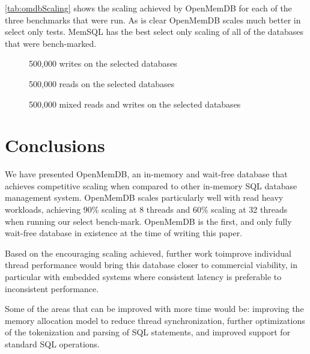 \documentclass[conference, compsoc]{IEEEtran}
\begin{document}
\ref{tab:omdbScaling} shows the scaling achieved by OpenMemDB for each of the three
benchmarks that were run. As is clear OpenMemDB scales much better in select only tests. 
MemSQL has the best select only scaling of all of the databases that were bench-marked.  

\begin{figure}
  \caption{500,000 writes on the selected databases}
\end{figure}

\begin{figure}
  \caption{500,000 reads on the selected databases}
\end{figure}

\begin{figure}
  \caption{500,000 mixed reads and writes on the selected databases}
\end{figure}

\section{Conclusions}
We have presented OpenMemDB, an in-memory and wait-free database that achieves competitive scaling when compared to other
in-memory SQL database management system.  OpenMemDB scales particularly well with read heavy workloads, achieving 90\% 
scaling at 8 threads and 60\% scaling at 32 threads when running our select bench-mark. OpenMemDB is the first, and only fully
wait-free database in existence at the time of writing this paper. 
\par\vspace{\baselineskip}
Based on the encouraging scaling achieved, further work toimprove individual thread performance would bring this database
closer to commercial viability, in particular with embedded systems where consistent latency is preferable to inconsistent
performance. 
\par\vspace{\baselineskip}
Some of the areas that can be improved with more time would be: improving the memory allocation model to reduce thread
synchronization, further optimizations of the tokenization and parsing of SQL statements, and improved support for standard
SQL operations.

\newpage


\newpage
\end{document}
